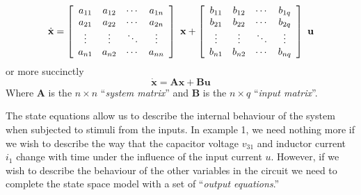 \begin{slide}\label{slides:l13s4}
\[
\dot{\mathbf{x}}=\left[\begin{array}{cccc}
  a_{11} & a_{12} & \cdots & a_{1n} \\
  a_{21} & a_{22} & \cdots & a_{2n} \\
  \vdots & \vdots & \ddots & \vdots \\
  a_{n1} & a_{n2} & \cdots & a_{nn}
\end{array}\right]\ \mathbf{x} + \left[\begin{array}{cccc}
  b_{11} & b_{12} & \cdots & b_{1q} \\
  b_{21} & b_{22} & \cdots & b_{2q} \\
  \vdots & \vdots & \ddots & \vdots \\
  b_{n1} & b_{n2} & \cdots & b_{nq}
\end{array}\right]\ \mathbf{u} \\
\]
or more succinctly
\[
\dot{\mathbf{x}}=\mathbf{A}\mathbf{x}+\mathbf{B}\mathbf{u}
\]
Where $\mathbf{A}$ is the $n\times n$ ``\emph{system matrix}'' and
$\mathbf{B}$ is the $n\times q$ ``\emph{input matrix}''.
\end{slide}


The state equations allow us to describe the internal behaviour of
the system when subjected to stimuli from the inputs. In
example 1, we need nothing more if we wish to describe the way that
the capacitor voltage $v_{31}$ and inductor current $i_1$ change
with time under the influence of the input current $u$. However,
if we wish to describe the behaviour of the other variables in the
circuit we need to complete the state space model with a set of
``\emph{output equations}.''

